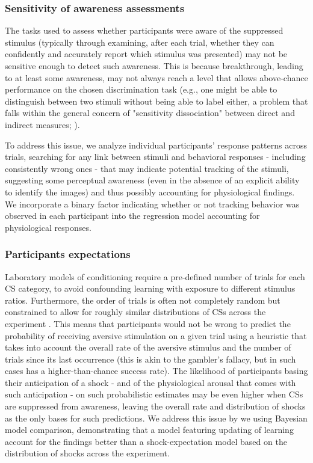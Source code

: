 \documentclass[12pt]{article}
\begin{document}
\subsubsection*{Sensitivity of awareness assessments}
\label{sec:org63c85ea}
The tasks used to assess whether participants were aware of the
suppressed stimulus (typically through examining, after each trial,
whether they can confidently and accurately report which stimulus was
presented) may not be sensitive enough to detect such awareness. This is
because breakthrough, leading to at least some awareness, may not always
reach a level that allows above-chance performance on the chosen
discrimination task (e.g., one might be able to distinguish between two
stimuli without being able to label either, a problem that falls within
the general concern of "sensitivity dissociation" between direct and
indirect measures; \cite{Stein2014a}).

To address this issue, we analyze individual participants' response
patterns across trials, searching for any link between stimuli and
behavioral responses - including consistently wrong ones - that may
indicate potential tracking of the stimuli, suggesting some perceptual
awareness (even in the absence of an explicit ability to identify the
images) and thus possibly accounting for physiological findings. We
incorporate a binary factor indicating whether or not tracking behavior
was observed in each participant into the regression model accounting
for physiological responses.

\subsubsection*{Participants expectations}
\label{sec:orgcf7b60f}
Laboratory models of conditioning require a pre-defined number of trials
for each CS category, to avoid confounding learning with exposure to
different stimulus ratios. Furthermore, the order of trials is often not
completely random but constrained to allow for roughly similar
distributions of CSs across the experiment
\cite{Schiller2008,Li2011}. This means that participants would not be
wrong to predict the probability of receiving aversive stimulation on a
given trial using a heuristic that takes into account the overall rate
of the aversive stimulus and the number of trials since its last
occurrence (this is akin to the gambler's fallacy, but in such cases has
a higher-than-chance success rate). The likelihood of participants
basing their anticipation of a shock - and of the physiological arousal
that comes with such anticipation - on such probabilistic estimates may
be even higher when CSs are suppressed from awareness, leaving the
overall rate and distribution of shocks as the only bases for such
predictions. We address this issue by we using Bayesian model
comparison, demonstrating that a model featuring updating of learning
account for the findings better than a shock-expectation model based on
the distribution of shocks across the experiment.
\end{document}

